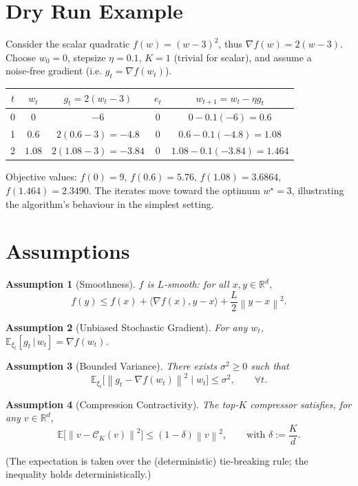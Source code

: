\documentclass{article}
\newtheorem{assumption}{Assumption}
\newcommand{\E}{\mathbb{E}}
\newcommand{\R}{\mathbb{R}}
\newcommand{\norm}[1]{\left\lVert#1\right\rVert}
\newcommand{\topK}[1]{\mathcal{C}_K\!\left(#1\right)}
\begin{document}
\section*{Dry Run Example}
Consider the scalar quadratic $f(w)=(w-3)^2$, thus $\nabla f(w)=2(w-3)$.  
Choose $w_0=0$, stepsize $\eta=0.1$, $K=1$ (trivial for scalar), and assume a noise‑free gradient (i.e. $g_t=\nabla f(w_t)$).

\begin{center}
\begin{tabular}{c|c|c|c|c}
$t$ & $w_t$ & $g_t=2(w_t-3)$ & $e_t$ & $w_{t+1}=w_t-\eta g_t$\\\hline
0 & $0$ & $-6$ & $0$ & $0-0.1(-6)=0.6$\\
1 & $0.6$ & $2(0.6-3)=-4.8$ & $0$ & $0.6-0.1(-4.8)=1.08$\\
2 & $1.08$ & $2(1.08-3)=-3.84$ & $0$ & $1.08-0.1(-3.84)=1.464$\\
\end{tabular}
\end{center}
Objective values: $f(0)=9$, $f(0.6)=5.76$, $f(1.08)=3.6864$, $f(1.464)=2.3490$.  
The iterates move toward the optimum $w^\star=3$, illustrating the algorithm’s behaviour in the simplest setting.

\newpage
\section*{Assumptions}
\begin{assumption}[Smoothness]\label{ass:smooth}
$f$ is $L$‑smooth: for all $x,y\in\R^d$,
\[
f(y)\le f(x)+\langle\nabla f(x),y-x\rangle+\frac{L}{2}\norm{y-x}^2 .
\]
\end{assumption}

\begin{assumption}[Unbiased Stochastic Gradient]\label{ass:unbiased}
For any $w_t$, $\E_{\xi_t}[g_t\,|\,w_t]=\nabla f(w_t)$.
\end{assumption}

\begin{assumption}[Bounded Variance]\label{ass:variance}
There exists $\sigma^2\ge0$ such that
\[
\E_{\xi_t}\!\big[\norm{g_t-\nabla f(w_t)}^2\mid w_t\big]\le\sigma^2,\qquad\forall t .
\]
\end{assumption}

\begin{assumption}[Compression Contractivity]\label{ass:contract}
The top‑$K$ compressor satisfies, for any $v\in\R^d$,
\[
\E\!\big[\norm{v-\topK{v}}^2\big]\le (1-\delta)\norm{v}^2,\qquad\text{with }\delta:=\frac{K}{d}.
\]
\end{assumption}
(The expectation is taken over the (deterministic) tie‑breaking rule; the inequality holds deterministically.)
\end{document}
